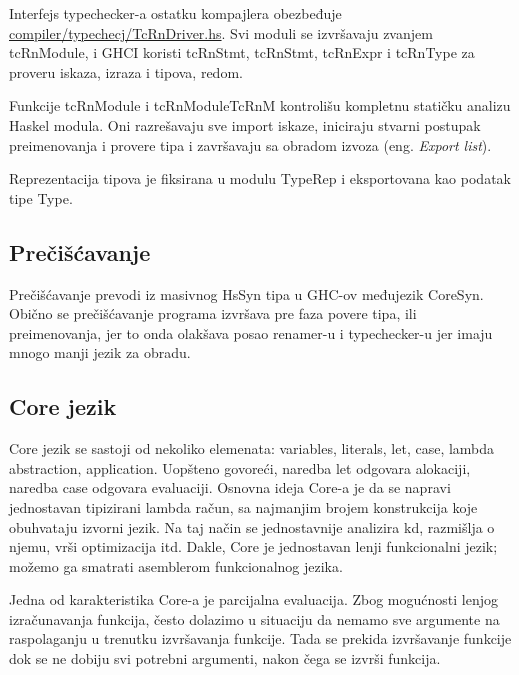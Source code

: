 Interfejs typechecker-a ostatku kompajlera obezbeđuje \\ \underline{compiler/typechecj/TcRnDriver.hs}. Svi moduli se izvršavaju zvanjem tcRnModule, i GHCI koristi tcRnStmt, tcRnStmt, tcRnExpr 
i tcRnType za proveru iskaza, izraza i tipova, redom.

Funkcije tcRnModule i tcRnModuleTcRnM kontrolišu kompletnu statičku analizu Haskel modula. Oni razrešavaju sve import iskaze, iniciraju stvarni postupak preimenovanja i provere tipa i završavaju sa obradom izvoza (eng. \emph{Export list}).

Reprezentacija tipova je fiksirana u modulu TypeRep i eksportovana kao podatak tipe Type.

\subsection{Prečišćavanje}
\label{subsec:podnaslovDesugar}

Prečišćavanje prevodi iz masivnog HsSyn tipa u GHC-ov međujezik CoreSyn. Obično se prečišćavanje programa izvršava pre faza povere tipa, ili preimenovanja, jer to onda olakšava posao renamer-u i typechecker-u jer imaju mnogo manji jezik za obradu.

\subsection{Core jezik}
\label{subsec:podnaslovCore}

Core jezik se sastoji od nekoliko elemenata: variables, literals, let, case, lambda abstraction, application. 
Uopšteno govoreći, naredba let odgovara alokaciji, naredba case odgovara evaluaciji.
Osnovna ideja Core-a je da se napravi jednostavan tipizirani lambda račun, sa najmanjim brojem konstrukcija koje obuhvataju izvorni jezik. Na taj način se jednostavnije analizira kd, razmišlja o njemu, vrši optimizacija itd.
Dakle, Core je jednostavan lenji funkcionalni jezik; možemo ga smatrati asemblerom funkcionalnog jezika.

Jedna od karakteristika Core-a je parcijalna evaluacija. Zbog mogućnosti lenjog izračunavanja funkcija, često dolazimo u situaciju da nemamo sve argumente na raspolaganju u trenutku izvršavanja funkcije. Tada se prekida izvršavanje funkcije dok se ne dobiju svi potrebni argumenti, nakon čega se izvrši funkcija. 
